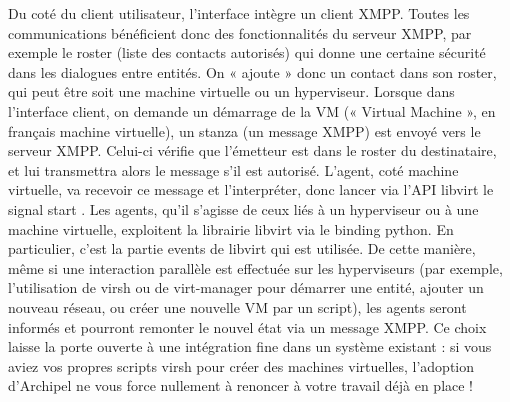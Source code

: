 Du coté du client utilisateur, l'interface intègre un client XMPP. Toutes les communications bénéficient donc des fonctionnalités du serveur XMPP, par exemple le roster (liste des contacts autorisés) qui donne
une certaine sécurité dans les dialogues entre entités. On « ajoute » donc un contact dans son roster, qui peut être soit une machine virtuelle ou un hyperviseur. Lorsque dans l'interface client, on demande un
démarrage de la VM (« Virtual Machine », en français machine virtuelle), un stanza (un message XMPP) est envoyé vers le serveur XMPP. Celui-ci vérifie que l’émetteur est dans le roster du destinataire, et lui
transmettra alors le message s'il est autorisé. L'agent, coté machine virtuelle, va recevoir ce message et l'interpréter, donc lancer via l'API libvirt le signal start .\newline
Les agents, qu'il s'agisse de ceux liés à un hyperviseur ou à une machine virtuelle, exploitent la librairie libvirt via le binding python. En particulier, c'est la partie events de libvirt qui est utilisée. De cette manière, même si une interaction parallèle est effectuée sur les hyperviseurs (par exemple, l'utilisation de virsh ou de virt-manager pour démarrer une entité, ajouter un nouveau réseau, ou créer une nouvelle VM par un script), les agents seront informés et pourront remonter le nouvel état via un message XMPP. Ce choix laisse la porte ouverte à une intégration fine dans un système existant : si vous aviez vos propres scripts virsh pour créer des machines virtuelles, l'adoption d'Archipel ne vous force nullement à renoncer à votre travail déjà en place !
